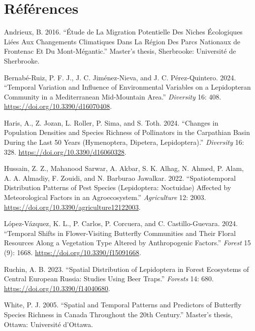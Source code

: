 \documentclass[9pt,twocolumn,twoside,]{pnas-new}
\newlength{\cslhangindent}
\newenvironment{CSLReferences}[2] %
 {\begin{list}{}{%
  \setlength{\itemindent}{0pt}
  \setlength{\leftmargin}{0pt}
  \setlength{\parsep}{0pt}
  \ifodd #1
   \setlength{\leftmargin}{\cslhangindent}
   \setlength{\itemindent}{-1\cslhangindent}
  \fi
  \setlength{\itemsep}{#2\baselineskip}}}
 {\end{list}}
\begin{document}
\section{Références}\label{ruxe9fuxe9rences}

\pnasbreak

\label{refs}
\begin{CSLReferences}{1}{0}
Andrieux, B. 2016. {``Étude de La Migration Potentielle Des Niches
Écologiques Liées Aux Changements Climatiques Dans La Région Des Parcs
Nationaux de Frontenac Et Du Mont-Mégantic.''} Master's thesis,
Sherbrooke: Université de Sherbrooke.

Bernabé-Ruiz, P. F. J., J. C. Jiménez-Nieva, and J. C. Pérez-Quintero.
2024. {``Temporal Variation and Influence of Environmental Variables on
a Lepidopteran Community in a Mediterranean Mid-Mountain Area.''}
\emph{Diversity} 16: 408. \url{https://doi.org/10.3390/d16070408}.

Haris, A., Z. Jozan, L. Roller, P. Sima, and S. Toth. 2024. {``Changes
in Population Densities and Species Richness of Pollinators in the
Carpathian Basin During the Last 50 Years (Hymenoptera, Dipetera,
Lepidoptera).''} \emph{Diversity} 16: 328.
\url{https://doi.org/10.3390/d16060328}.

Hussain, Z. Z., Mahanood Sarwar, A. Akbar, S. K. Alhag, N. Ahmed, P.
Alam, A. A. Almadiy, F. Zouidi, and N. Barburao Jawalkar. 2022.
{``Spatiotemporal Distribution Patterns of Pest Species (Lepidoptera:
Noctuidae) Affected by Meteorological Factors in an Agroecosystem.''}
\emph{Agriculture} 12: 2003.
\url{https://doi.org/10.3390/agriculture12122003}.

López-Vázquez, K. L., P. Carlos, P. Corcuera, and C. Castillo-Guevara.
2024. {``Temporal Shifts in Flower-Visiting Butterfly Communities and
Their Floral Resources Along a Vegetation Type Altered by Anthropogenic
Factors.''} \emph{Forest} 15 (9): 1668.
\url{https://doi.org/10.3390/f15091668}.

Ruchin, A. B. 2023. {``Spatial Distribution of Lepidoptera in Forest
Ecosystems of Central European Russia: Studies Using Beer Traps.''}
\emph{Forests} 14: 680. \url{https://doi.org/10.3390/f14040680}.

White, P. J. 2005. {``Spatial and Temporal Patterns and Predictors of
Butterfly Species Richness in Canada Throughout the 20th Century.''}
Master's thesis, Ottawa: Université d'Ottawa.

\end{CSLReferences}



% 
\end{document}
